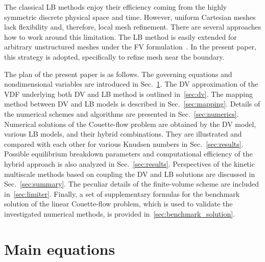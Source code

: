\documentclass{elsarticle} %
\begin{document}
The classical LB methods enjoy their efficiency coming from the highly symmetric discrete physical space and time.
However, uniform Cartesian meshes lack flexibility and, therefore, local mesh refinement.
There are several approaches how to work around this limitation.
The LB method is easily extended for arbitrary unstructured meshes
under the FV formulation~\cite{Succi1992, Peng1999, Patil2009, Li2016}.
In the present paper, this strategy is adopted, specifically to refine mesh near the boundary.

The plan of the present paper is as follows.
The governing equations and nondimensional variables are introduced in Sec.~\ref{sec:equations}.
The DV approximation of the VDF underlying both DV and LB method is outlined in~\ref{sec:dv}.
The mapping method between DV and LB models is described in Sec.~\ref{sec:mapping}.
Details of the numerical schemes and algorithms are presented in Sec.~\ref{sec:numerics}.
Numerical solutions of the Couette-flow problem are obtained by the DV model,
various LB models, and their hybrid combinations.
They are illustrated and compared with each other for various Knudsen numbers in Sec.~\ref{sec:results}.
Possible equilibrium breakdown parameters and computational efficiency of the hybrid approach
is also analyzed in Sec.~\ref{sec:results}.
Perspectives of the kinetic multiscale methods based on coupling the DV and LB solutions
are discussed in Sec.~\ref{sec:summary}.
The peculiar details of the finite-volume scheme are included in~\ref{sec:limiter}.
Finally, a set of supplementary formulas for the benchmark solution of the linear Couette-flow problem,
which is used to validate the investigated numerical methods, is provided in~\ref{sec:benchmark_solution}.

\section{Main equations}\label{sec:equations}
\end{document}
